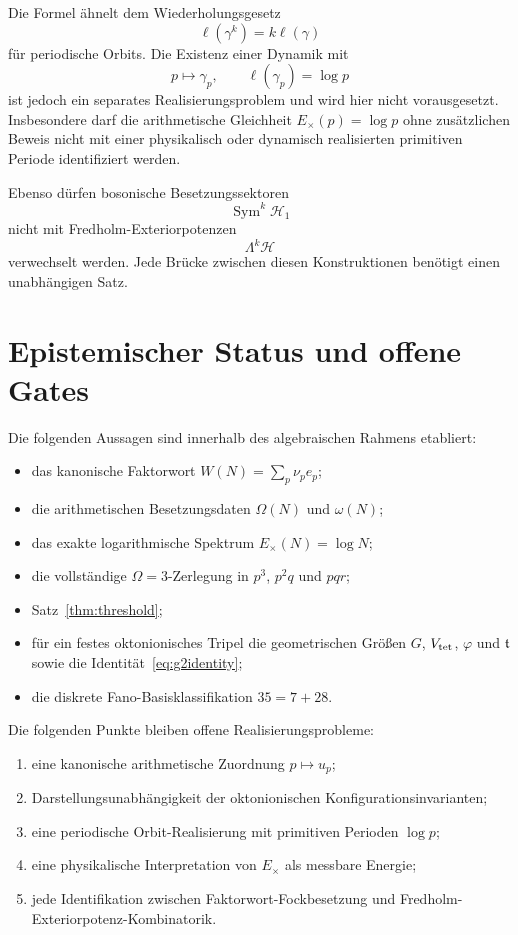 \documentclass[11pt,a4paper]{article}
\theoremstyle{definition}
\theoremstyle{remark}
\newcommand{\Sym}{\operatorname{Sym}}
\begin{document}
Die Formel ähnelt dem Wiederholungsgesetz
\[
\ell(\gamma^k)=k\ell(\gamma)
\]
für periodische Orbits. Die Existenz einer Dynamik mit
\[
p\longmapsto\gamma_p,\qquad \ell(\gamma_p)=\log p
\]
ist jedoch ein separates Realisierungsproblem und wird hier nicht vorausgesetzt. Insbesondere darf die arithmetische Gleichheit $E_\times(p)=\log p$ ohne zusätzlichen Beweis nicht mit einer physikalisch oder dynamisch realisierten primitiven Periode identifiziert werden.

Ebenso dürfen bosonische Besetzungssektoren
\[
\Sym^k\mathcal H_1
\]
nicht mit Fredholm-Exteriorpotenzen
\[
\Lambda^k\mathcal H
\]
verwechselt werden. Jede Brücke zwischen diesen Konstruktionen benötigt einen unabhängigen Satz.

\section{Epistemischer Status und offene Gates}
Die folgenden Aussagen sind innerhalb des algebraischen Rahmens etabliert:
\begin{itemize}
\item das kanonische Faktorwort $W(N)=\sum_p\nu_pe_p$;
\item die arithmetischen Besetzungsdaten $\Omega(N)$ und $\omega(N)$;
\item das exakte logarithmische Spektrum $E_\times(N)=\log N$;
\item die vollständige $\Omega=3$-Zerlegung in $p^3$, $p^2q$ und $pqr$;
\item Satz~\ref{thm:threshold};
\item für ein festes oktonionisches Tripel die geometrischen Größen $G$, $V_{\rm tet}$, $\varphi$ und $\mathfrak t$ sowie die Identität~\eqref{eq:g2identity};
\item die diskrete Fano-Basisklassifikation $35=7+28$.
\end{itemize}

Die folgenden Punkte bleiben offene Realisierungsprobleme:
\begin{enumerate}
\item eine kanonische arithmetische Zuordnung $p\mapsto u_p$;
\item Darstellungsunabhängigkeit der oktonionischen Konfigurationsinvarianten;
\item eine periodische Orbit-Realisierung mit primitiven Perioden $\log p$;
\item eine physikalische Interpretation von $E_\times$ als messbare Energie;
\item jede Identifikation zwischen Faktorwort-Fockbesetzung und Fredholm-Exteriorpotenz-Kombinatorik.
\end{enumerate}
\end{document}
